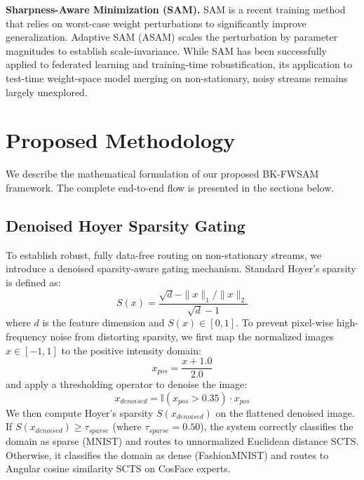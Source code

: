 \documentclass{article}
\theoremstyle{plain}
\theoremstyle{definition}
\theoremstyle{remark}
\begin{document}
\textbf{Sharpness-Aware Minimization (SAM).} SAM \cite{foret2021sharpness} is a recent training method that relies on worst-case weight perturbations to significantly improve generalization. Adaptive SAM (ASAM) \cite{kwon2021asam} scales the perturbation by parameter magnitudes to establish scale-invariance. While SAM has been successfully applied to federated learning and training-time robustification, its application to test-time weight-space model merging on non-stationary, noisy streams remains largely unexplored.

\section{Proposed Methodology}
\label{sec:method}

We describe the mathematical formulation of our proposed BK-FWSAM framework. The complete end-to-end flow is presented in the sections below.

\subsection{Denoised Hoyer Sparsity Gating}
To establish robust, fully data-free routing on non-stationary streams, we introduce a denoised sparsity-aware gating mechanism. Standard Hoyer's sparsity \cite{hoyer2004non} is defined as:
\begin{equation}
  S(x) = \frac{\sqrt{d} - \|x\|_1/\|x\|_2}{\sqrt{d} - 1}
\end{equation}
where $d$ is the feature dimension and $S(x) \in [0, 1]$. To prevent pixel-wise high-frequency noise from distorting sparsity, we first map the normalized images $x \in [-1, 1]$ to the positive intensity domain:
\begin{equation}
  x_{pos} = \frac{x + 1.0}{2.0}
\end{equation}
and apply a thresholding operator to denoise the image:
\begin{equation}
  x_{denoised} = \mathbb{I}(x_{pos} > 0.35) \cdot x_{pos}
\end{equation}
We then compute Hoyer's sparsity $S(x_{denoised})$ on the flattened denoised image. If $S(x_{denoised}) \geq \tau_{sparse}$ (where $\tau_{sparse} = 0.50$), the system correctly classifies the domain as sparse (MNIST) and routes to unnormalized Euclidean distance SCTS. Otherwise, it classifies the domain as dense (FashionMNIST) and routes to Angular cosine similarity SCTS on CosFace experts.
\end{document}

